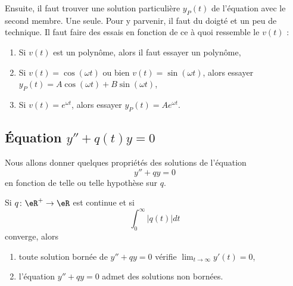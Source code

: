 Ensuite, il faut trouver une solution particulière \( y_P(t)\) de l'équation avec le second membre. Une seule. Pour y parvenir, il faut du doigté et un peu de technique. Il faut faire des essais en fonction de ce à quoi ressemble le \( v(t)\) :
\begin{enumerate}

	\item
	      Si \( v(t)\) est un polynôme, alors il faut essayer un polynôme,

	\item
	      Si \( v(t)=\cos(\omega t)\) ou bien \( v(t)=\sin(\omega t)\), alors essayer \( y_P(t)=A\cos(\omega t)+B\sin(\omega t)\),

	\item
	      Si \( v(t)= e^{\omega t}\), alors essayer \( y_P(t)=A e^{\omega t}\).

\end{enumerate}

\subsection{Équation \texorpdfstring{\( y''+q(t)y=0\)}{y''+q(t)y=0}}
\label{subsecSyTwyM}


Nous allons donner quelques propriétés des solutions de l'équation
\begin{equation}
	y''+qy=0
\end{equation}
en fonction de telle ou telle hypothèse sur \( q\).

\begin{proposition}
	Si \( q\colon \eR^+\to \eR\) est continue et si
	\begin{equation}
		\int_0^{\infty}| q(t) |dt
	\end{equation}
	converge, alors
	\begin{enumerate}
		\item
		      toute solution bornée de \( y''+qy=0\) vérifie \( \lim_{t\to \infty} y'(t)=0\),
		\item
		      l'équation \( y''+qy=0\) admet des solutions non bornées.
	\end{enumerate}
\end{proposition}

